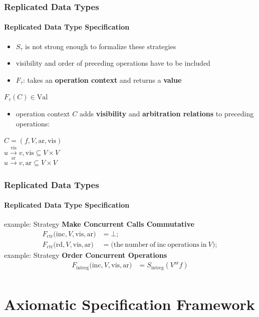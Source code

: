 \documentclass[11pt]{beamer}
\begin{document}
\begin{frame}
\frametitle{Replicated Data Types}
\framesubtitle{Replicated Data Type Specification}
\begin{itemize}
\item \(S_{\tau}\) is not strong enough to formalize these strategies
\item visibility and order of preceding operations have to be included
\pause
\item \(F_\tau\): takes an \textbf{operation context} and returns a \textbf{value}
\end{itemize}

\begin{center}
\(F_\tau(C) \in \mathrm{Val}\) \\
\end{center}
\pause
\begin{itemize}
\item operation context \(C\) adds \textbf{visibility} and \textbf{arbitration relations} to preceding operations:
\end{itemize}

\begin{center}
\(C = (f, V, \mathrm{ar}, \mathrm{vis})\) \\
\pause
\(u \xrightarrow{\mathrm{vis}} v, \mathrm{vis} \subseteq V \times V  \) \\
\pause
\(u \xrightarrow{\mathrm{ar}} v, \mathrm{ar} \subseteq V \times V  \)
\end{center}

\end{frame}


\begin{frame}
\frametitle{Replicated Data Types}
\framesubtitle{Replicated Data Type Specification}
example: Strategy \textbf{Make Concurrent Calls Commutative}
\begin{align*}
F_{\mathrm{ctr}} \mathrm{(inc}, V, \mathrm{vis, ar)} &= \bot; \\
F_{\mathrm{ctr}} \mathrm{(rd}, V, \mathrm{vis, ar)} &= \mathrm{(the\ number\ of\ inc\ operations\ in\ } V);
\end{align*}
\pause
example: Strategy \textbf{Order Concurrent Operations}
\begin{align*}
F_{\mathrm{intreg}} \mathrm{(inc}, V, \mathrm{vis, ar)} &= S_{\mathrm{intreg}}(V^{\mathrm{ar}} f) \\
\end{align*}
\end{frame}

\section{Axiomatic Specification Framework}
\end{document}
